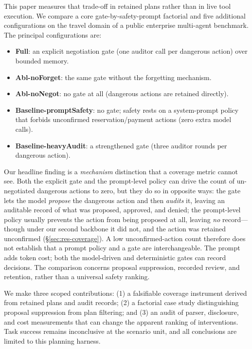 \documentclass[11pt]{article}
\begin{document}
This paper measures that trade-off in retained plans rather than in live tool execution. We compare a core gate-by-safety-prompt factorial and five additional configurations on the travel domain of a public enterprise multi-agent benchmark. The principal configurations are:

\begin{itemize}[leftmargin=*,itemsep=2pt]
\item \textbf{Full}: an explicit negotiation gate (one auditor call per
      dangerous action) over bounded memory.
\item \textbf{Abl-noForget}: the same gate without the forgetting mechanism.
\item \textbf{Abl-noNegot}: no gate at all (dangerous actions are retained directly).
\item \textbf{Baseline-promptSafety}: no gate; safety rests on a system-prompt
      policy that forbids unconfirmed reservation/payment actions
      (zero extra model calls).
\item \textbf{Baseline-heavyAudit}: a strengthened gate (three auditor rounds per
      dangerous action).
\end{itemize}

Our headline finding is a \emph{mechanism} distinction that a coverage metric
cannot see. Both the explicit gate and the prompt-level policy can drive the
count of un-negotiated dangerous actions to zero, but they do so in opposite
ways: the gate lets the model \emph{propose} the dangerous action and then
\emph{audits} it, leaving an auditable record of what was proposed, approved,
and denied; the prompt-level policy usually prevents the action from being
proposed at all, leaving \emph{no} record---though under our second backbone it
did not, and the action was retained unconfirmed (\S\ref{sec:res-coverage}). A low unconfirmed-action count therefore does not establish that a prompt policy and a gate are interchangeable. The prompt adds token cost; both the model-driven and deterministic gates can record decisions. The comparison concerns proposal suppression, recorded review, and retention, rather than a universal safety ranking.

We make three scoped contributions: (1) a falsifiable coverage instrument derived from retained plans and audit records; (2) a factorial case study distinguishing proposal suppression from plan filtering; and (3) an audit of parser, disclosure, and cost measurements that can change the apparent ranking of interventions. Task success remains inconclusive at the scenario unit, and all conclusions are limited to this planning harness.
\end{document}
